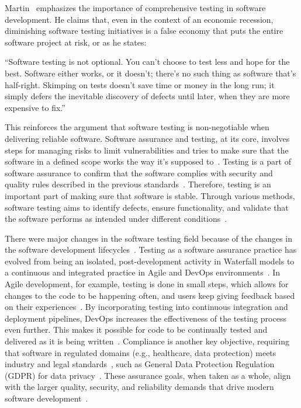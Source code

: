 \documentclass[
	msc, %
	english %
]{../ppgccufmg}
\newcommand{\citacaodireta}[2]{%
  \begin{list}{}{
    \setlength{\leftmargin}{4cm}    %
    \setlength{\rightmargin}{0cm}   %
  }
  \item[] %
  \small %
  \singlespacing %
  ``#1''~\cite{#2} %
  \end{list}
}
\begin{document}
    Martin~\cite{martin2020} emphasizes the importance of comprehensive testing in software development. He claims that, even in the context of an economic recession, diminishing software testing initiatives is a false economy that puts the entire software project at risk, or as he states:

    \citacaodireta{Software testing is not optional. You can't choose to test less and hope for the best. Software either works, or it doesn't; there's no such thing as software that's half-right. Skimping on tests doesn't save time or money in the long run; it simply defers the inevitable discovery of defects until later, when they are more expensive to fix.}{martin2020}
    
    This reinforces the argument that software testing is non-negotiable when delivering reliable software. Software assurance and testing, at its core, involves steps for managing risks to limit vulnerabilities and tries to make sure that the software in a defined scope works the way it's supposed to~\cite{ross2018nist,Sommerville2011}. Testing is a part of software assurance to confirm that the software complies with security and quality rules described in the previous standards~\cite{ISO29119-1}. Therefore, testing is an important part of making sure that software is stable. Through various methods, software testing aims to identify defects, ensure functionality, and validate that the software performs as intended under different conditions~\cite{myers2011wiley}.

    There were major changes in the software testing field because of the changes in the software development lifecycles~\cite{crispin2009,Sommerville2015}. Testing as a software assurance practice has evolved from being an isolated, post-development activity in Waterfall models to a continuous and integrated practice in Agile and DevOps environments~\cite{humble2010,Pressman2020}. In Agile development, for example, testing is done in small steps, which allows for changes to the code to be happening often, and users keep giving feedback based on their experiences~\cite{agile-manifesto}. By incorporating testing into continuous integration and deployment pipelines, DevOps increases the effectiveness of the testing process even further. This makes it possible for code to be continually tested and delivered as it is being written~\cite{fowler2006ci}. Compliance is another key objective, requiring that software in regulated domains (e.g., healthcare, data protection) meets industry and legal standards~\cite{Mouratidis2007}, such as General Data Protection Regulation (GDPR) for data privacy~\cite{EU2016}. These assurance goals, when taken as a whole, align with the larger quality, security, and reliability demands that drive modern software development~\cite{Bass2015}.
\end{document}
